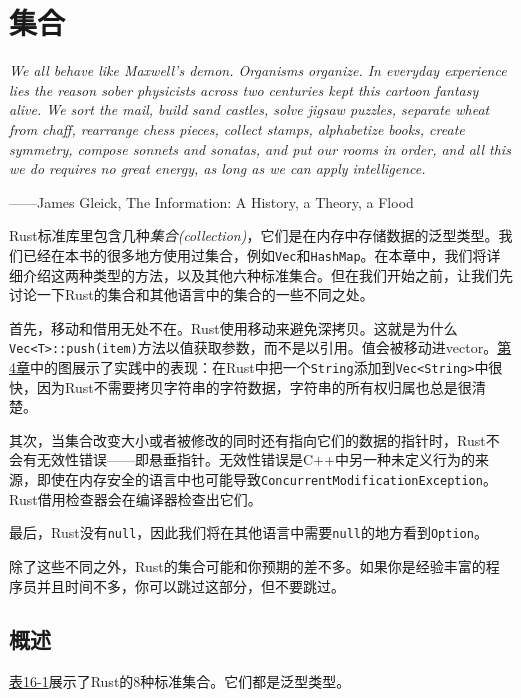 \chapter{集合}\label{ch16}

\emph{We all behave like Maxwell’s demon. Organisms organize. In everyday experience lies the reason sober physicists across two centuries kept this cartoon fantasy alive. We sort the mail, build sand castles, solve jigsaw puzzles, separate wheat from chaff, rearrange chess pieces, collect stamps, alphabetize books, create symmetry, compose sonnets and sonatas, and put our rooms in order, and all this we do requires no great energy, as long as we can apply intelligence.}

\begin{flushright}
    ——James Gleick, The Information: A History, a Theory, a Flood
\end{flushright}

Rust标准库里包含几种\emph{集合(collection)}，它们是在内存中存储数据的泛型类型。我们已经在本书的很多地方使用过集合，例如\texttt{Vec}和\texttt{HashMap}。在本章中，我们将详细介绍这两种类型的方法，以及其他六种标准集合。但在我们开始之前，让我们先讨论一下Rust的集合和其他语言中的集合的一些不同之处。

首先，移动和借用无处不在。Rust使用移动来避免深拷贝。这就是为什么\\
\texttt{Vec<T>::push(item)}方法以值获取参数，而不是以引用。值会被移动进vector。\hyperref[ch04]{第4章}中的图展示了实践中的表现：在Rust中把一个\texttt{String}添加到\texttt{Vec<String>}中很快，因为Rust不需要拷贝字符串的字符数据，字符串的所有权归属也总是很清楚。

其次，当集合改变大小或者被修改的同时还有指向它们的数据的指针时，Rust不会有无效性错误——即悬垂指针。无效性错误是C++中另一种未定义行为的来源，即使在内存安全的语言中也可能导致\texttt{ConcurrentModificationException}。Rust借用检查器会在编译器检查出它们。

最后，Rust没有\texttt{null}，因此我们将在其他语言中需要\texttt{null}的地方看到\texttt{Option}。

除了这些不同之外，Rust的集合可能和你预期的差不多。如果你是经验丰富的程序员并且时间不多，你可以跳过这部分，但不要跳过。

\section{概述}

\hyperref[t16-1]{表16-1}展示了Rust的8种标准集合。它们都是泛型类型。


